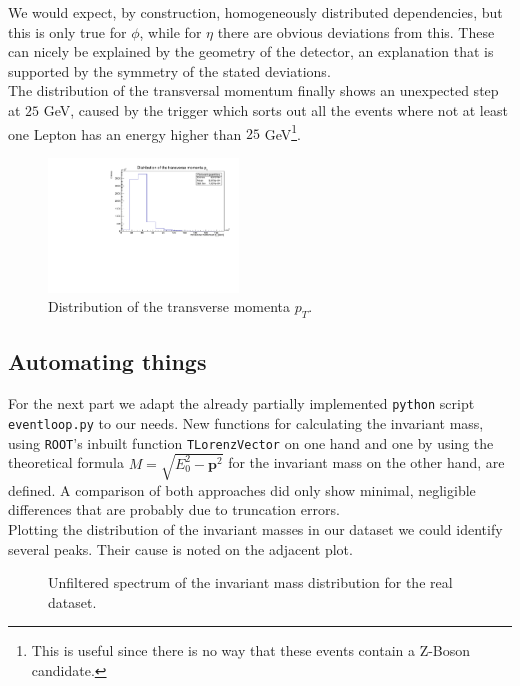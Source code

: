\documentclass[twocolumn,
			   showpacs,%
               nofootinbib,
               aps,%
               prd,
               notitlepage,
               showkeys,
               10pt]{revtex4-1}
\begin{document}
We would expect, by construction, homogeneously distributed dependencies, but this is only true for $\phi$, while for $\eta$ there are obvious deviations from this.
These can nicely be explained by the geometry of the detector, an explanation that is supported by the symmetry of the stated deviations.\\

The distribution of the transversal momentum finally shows an unexpected step at $25$ GeV, caused by the trigger which sorts out all the events where not at least one Lepton has an energy higher than $25$ GeV\footnote{This is useful since there is no way that these events contain a Z-Boson candidate.}.
\begin{figure}[H]
	\centering
	\includegraphics[width=0.45\textwidth]{figures/plots/TransverseMomentum}
	\caption{Distribution of the transverse momenta $p_T$.}
\end{figure}

\subsection{Automating things}
For the next part we adapt the already partially implemented \verb|python| script \verb|eventloop.py| to our needs. New functions for calculating the invariant mass, using \verb|ROOT|'s inbuilt function \verb|TLorenzVector| on one hand and one by using the theoretical formula $M = \sqrt{E_0^2 - \mathbf{p}^2}$ for the invariant mass on the other hand, are defined. A comparison of both approaches did only show minimal, negligible differences that are probably due to truncation errors.\\

Plotting the distribution of the invariant masses in our dataset we could identify several peaks. Their cause is noted on the adjacent plot.
\begin{figure}[H]
	\centering
	\caption{Unfiltered spectrum of the invariant mass distribution for the real dataset.}
\end{figure}
\end{document}
